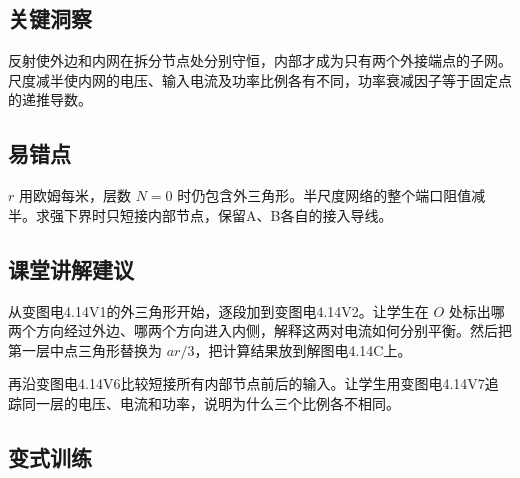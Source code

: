 \documentclass[UTF8,fontset=fandol,a4paper,11pt]{ctexart}
\begin{document}


\subsection*{关键洞察}

反射使外边和内网在拆分节点处分别守恒，内部才成为只有两个外接端点的子网。尺度减半使内网的电压、输入电流及功率比例各有不同，功率衰减因子等于固定点的递推导数。



\subsection*{易错点}

$r$ 用欧姆每米，层数 $N=0$ 时仍包含外三角形。半尺度网络的整个端口阻值减半。求强下界时只短接内部节点，保留A、B各自的接入导线。



\subsection*{课堂讲解建议}

从变图电4.14V1的外三角形开始，逐段加到变图电4.14V2。让学生在 $O$ 处标出哪两个方向经过外边、哪两个方向进入内侧，解释这两对电流如何分别平衡。然后把第一层中点三角形替换为 $ar/3$，把计算结果放到解图电4.14C上。

再沿变图电4.14V6比较短接所有内部节点前后的输入。让学生用变图电4.14V7追踪同一层的电压、电流和功率，说明为什么三个比例各不相同。


\subsection*{变式训练}
\end{document}
